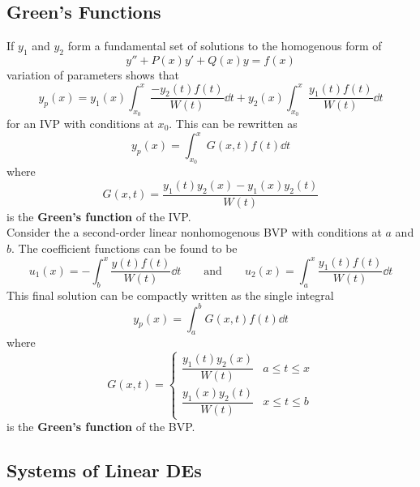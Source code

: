 \documentclass[12pt, A4]{article}
\begin{document}
		\subsection{Green's Functions}
			If \(y_1\) and \(y_2\) form a fundamental set of solutions to the homogenous form of
				\[y'' + P(x)y' + Q(x)y = f(x)\]
				variation of parameters shows that
				\[y_p(x) = y_1(x)\int_{x_0}^x \frac{-y_2(t)f(t)}{W(t)}\dd{t} + y_2(x)\int_{x_0}^x \frac{y_1(t)f(t)}{W(t)}\dd{t}\]
				for an IVP with conditions at \(x_0\). This can be rewritten as
				\[\boxed{y_p(x) = \int_{x_0}^x G(x, t)f(t)\dd{t}}\]
				where
				\[\boxed{G(x, t) = \frac{y_1(t)y_2(x) - y_1(x)y_2(t)}{W(t)}}\]
				is the \textbf{Green's function} of the IVP. \\
			Consider the a second-order linear nonhomogenous BVP with conditions at \(a\) and \(b\). The coefficient functions can be found to be
				\[
					u_1(x) = -\int_b^x\frac{y(t)f(t)}{W(t)}\dd{t} \qquad \text{and} \qquad
					u_2(x) = \int_a^x\frac{y_1(t)f(t)}{W(t)}\dd{t}
				\]
				This final solution can be compactly written as the single integral
				\[\boxed{y_p(x) = \int_a^b G(x, t)f(t) \dd{t}}\]
				where
				\[\boxed{
					G(x, t) = \begin{cases}
						\dfrac{y_1(t)y_2(x)}{W(t)} & a \le t \le x \\
						\dfrac{y_1(x)y_2(t)}{W(t)} & x \le t \le b
					\end{cases}
				}\]
				is the \textbf{Green's function} of the BVP.
		\subsection{Systems of Linear DEs}
			
\end{document}
